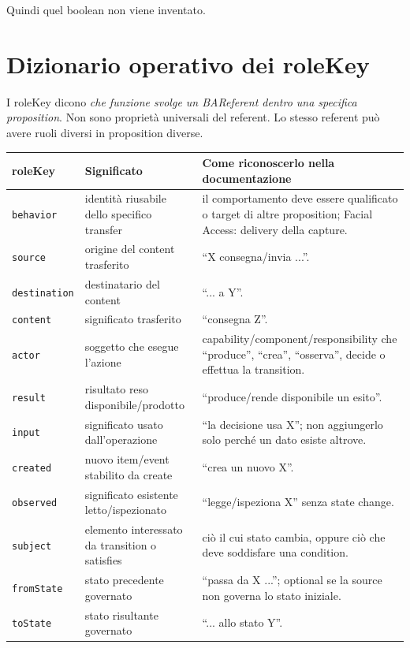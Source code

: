 \documentclass[11pt,a4paper]{article}
\newcommand{\code}[1]{\nolinkurl{#1}}
\begin{document}
Quindi quel boolean non viene inventato.

\section{Dizionario operativo dei roleKey}

I roleKey dicono \emph{che funzione svolge un BAReferent dentro una specifica proposition}. Non sono proprietà universali del referent. Lo stesso referent può avere ruoli diversi in proposition diverse.

\begin{longtable}{L{0.28\textwidth}L{0.25\textwidth}L{0.33\textwidth}}
\toprule
\textbf{roleKey} & \textbf{Significato} & \textbf{Come riconoscerlo nella documentazione} \\
\midrule\endhead
\code{behavior} & identità riusabile dello specifico transfer & il comportamento deve essere qualificato o target di altre proposition; Facial Access: delivery della capture. \\
\code{source} & origine del content trasferito & ``X consegna/invia ...''. \\
\code{destination} & destinatario del content & ``... a Y''. \\
\code{content} & significato trasferito & ``consegna Z''. \\
\code{actor} & soggetto che esegue l'azione & capability/component/responsibility che ``produce'', ``crea'', ``osserva'', decide o effettua la transition. \\
\code{result} & risultato reso disponibile/prodotto & ``produce/rende disponibile un esito''. \\
\code{input} & significato usato dall'operazione & ``la decisione usa X''; non aggiungerlo solo perché un dato esiste altrove. \\
\code{created} & nuovo item/event stabilito da create & ``crea un nuovo X''. \\
\code{observed} & significato esistente letto/ispezionato & ``legge/ispeziona X'' senza state change. \\
\code{subject} & elemento interessato da transition o satisfies & ciò il cui stato cambia, oppure ciò che deve soddisfare una condition. \\
\code{fromState} & stato precedente governato & ``passa da X ...''; optional se la source non governa lo stato iniziale. \\
\code{toState} & stato risultante governato & ``... allo stato Y''. \\

\end{longtable}
\end{document}
